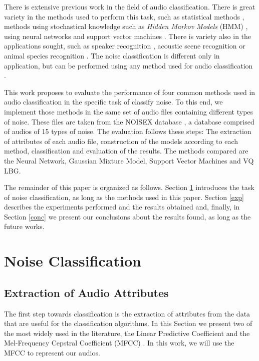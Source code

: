 \documentclass[12pt]{article}
\begin{document}
There is extensive previous work in the field of audio classification. There is great variety in the methods used to perform this task, such as statistical methods \cite{dal1988acoustic,peltonen2002computational}, methods using stochastical knowledge such as \textit{Hidden Markov Models} (HMM) \cite{ma2003context}, using neural networks \cite{beritelli2005adaptive} and support vector machines \cite{cumani2012analysis}. There is variety also in the applications sought, such as speaker recognition \cite{kinnunen2010overview,murty2006combining,farrell1994speaker}, acoustic scene recognition \cite{piczak2015environmental,barchiesi2015acoustic} or animal species recognition \cite{somervuo2006parametric,lee2008automatic}. The noise classification is different only in application, but can be performed using any method used for audio classification \cite{beritelli2007adaptive,ma2006acoustic}.

This work proposes to evaluate the performance of four common methods used in audio classification in the specific task of classify noise. To this end, we implement those methods in the same set of audio files containing different types of noise. These files are taken from the NOISEX database \cite{varga1993assessment}, a database comprised of audios of 15 types of noise. The evaluation follows these steps: The extraction of attributes of each audio file, construction of the models according to each method, classification and evaluation of the results. The methods compared are the Neural Network, Gaussian Mixture Model, Support Vector Machines and VQ LBG.

The remainder of this paper is organized as follows. Section \ref{class} introduces the task of noise classification, as long as the methods used in this paper. Section \ref{exp} describes the experiments performed and the results obtained and, finally, in Section \ref{conc} we present our conclusions about the results found, as long as the future works.

\section{Noise Classification} \label{class}


\subsection{Extraction of Audio Attributes} \label{class:audioatt}

The first step towards classification is the extraction of attributes from the data that are useful for the classification algorithms. In this Section we present two of the most widely used in the literature, the Linear Predictive Coefficient \cite{Rabiner:1993:FSR:153687} and the Mel-Frequency Cepstral Coefficient (MFCC) \cite{xu2005automatic}. In this work, we will use the MFCC to represent our audios.
\end{document}
